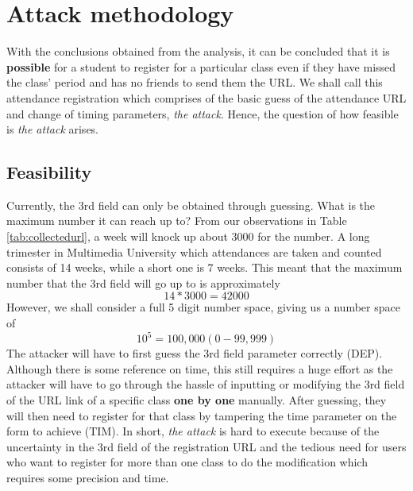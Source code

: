 \documentclass[runningheads]{llncs}
\begin{document}
\clearpage{}

\section{Attack methodology}
\newcommand{\theattack}[1]{\textit{the attack}}
\newcommand{\scanattack}[1]{\textit{scan attack}}

With the conclusions obtained from the analysis, it can be concluded that it is \textbf{possible} for a student to register for a particular class even if they have missed the class' period and has no friends to send them the URL. We shall call this attendance registration which comprises of the basic guess of the attendance URL and change of timing parameters, \theattack{}. Hence, the question of how feasible is \theattack{} arises. 

\subsection{Feasibility}
Currently, the 3rd field can only be obtained through guessing. What is the maximum number it can reach up to? From our observations in Table \ref{tab:collectedurl}, a week will knock up about 3000 for the number. A long trimester in Multimedia University which attendances are taken and counted consists of 14 weeks, while a short one is 7 weeks. This meant that the maximum number that the 3rd field will go up to is approximately \noindent\begin{equation}
    14 * 3000  = 42000 
\end{equation} However, we shall consider a full 5 digit number space, giving us a number space of \noindent\begin{equation}10^5 = 100,000 (0-99,999)\end{equation}    
The attacker will have to first guess the 3rd field parameter correctly (DEP). Although there is some reference on time, this still requires a huge effort as the attacker will have to go through the hassle of inputting or modifying the 3rd field of the URL link of a specific class \textbf{one by one} manually. After guessing, they will then need to register for that class by tampering the time parameter on the form to achieve (TIM). In short, \theattack{} is hard to execute because of the uncertainty in the 3rd field of the registration URL and the tedious need for users who want to register for more than one class to do the modification which requires some precision and time.
\end{document}
